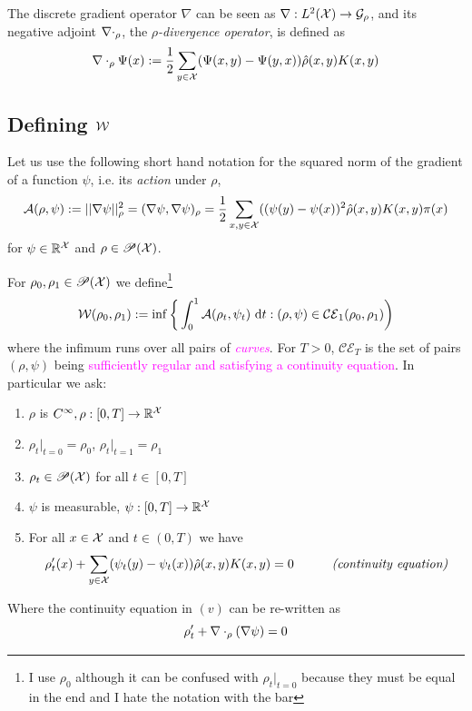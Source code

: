 The discrete gradient operator $\nabla$ can be seen as $\nabla:L^2(\mathcal{X})\to\mathcal{G}_\rho$, and its negative adjoint $\nabla \cdot_\rho$, the \emph{$\rho$-divergence operator}, is defined as
\[
\nabla \cdot_\rho\Psi(x):=\frac{1}{2}\sum_{y\in\mathcal{X}}(\Psi(x,y) - \Psi(y,x))\hat \rho(x,y)K(x,y)
\]

\subsection{Defining $\W$}

Let us use the following short hand notation for the squared norm of the gradient of a function $\psi$, i.e. its \emph{action} under $\rho$,
\[
\mathcal{A}(\rho,\psi):=||\nabla\psi||^2_\rho = (\nabla \psi,    \nabla\psi)_\rho= \frac{1}{2}\sum_{x,y\in\mathcal{X}}((\psi(y)-\psi(x))^2\hat \rho(x,y) K(x,y) \pi(x)
\]
for $\psi \in \mathbb{R}^{\mathcal{X}}$ and $\rho\in\mathscr{P}(\mathcal{X})$.

\begin{definition}[Distance $\W$]
For $\rho_0,\rho_1 \in \mathscr{P}(\mathcal{X})$ we define\footnote{I use $\rho_0$ although it can be confused with $\rho_t|_{t=0}$ because they must be equal in the end and I hate the notation with the bar}
\[
\mathcal{W}(\rho_0,\rho_1):=\inf\bigg\{\int_0^1 \mathcal{A}(\rho_t,\psi_t) \, \mathop{}\!\mathrm{d} t: (\rho,\psi) \in \mathcal{CE}_1(\rho_0,\rho_1)\bigg)
\]
where the infimum runs over all pairs of \textcolor{magenta}{\emph{curves}}. For $T>0$, $\mathcal{CE}_T$ is the set of pairs $(\rho,\psi)$ being \textcolor{magenta}{sufficiently regular and satisfying a continuity equation}. In particular we ask:
\begin{enumerate}[label=($\roman*$)]
    \item $\rho$ is $C^\infty, \rho:[0,T]\to\mathbb{R}^{\mathcal{X}}$
    \item $\rho_t|_{t=0}=\rho_0$, $\rho_t|_{t=1}=\rho_1$
    \item $\rho_t\in\mathscr{P}(\mathcal{X})$ for all $t\in[0,T]$
    \item $\psi$ is measurable, $\psi:[0,T]\to\mathbb{R}^{\mathcal{X}}$
    \item For all $x \in \mathcal{X}$ and $t\in(0,T)$ we have
    \[
    \rho_t'(x) +\sum_{y\in\mathcal{X}} (\psi_t(y)-\psi_t(x))\hat\rho(x,y)K(x,y)=0 \quad \quad \quad \textit{(continuity equation)}
    \]
\end{enumerate}
Where the continuity equation in $(v)$ can be re-written as 
\begin{equation}\label{eq: cont}
    \rho_t'+\nabla \cdot_\rho(\nabla\psi)=0
\end{equation}
\end{definition}

